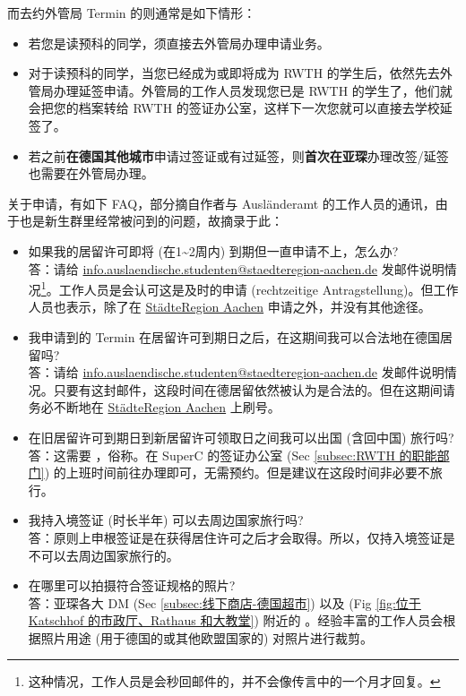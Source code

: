     而去约外管局 Termin 的则通常是如下情形：

    \begin{itemize}
      \item 若您是读预科的同学，须直接去外管局办理申请业务。
      \item 对于读预科的同学，当您已经成为或即将成为 RWTH 的学生后，依然先去外管局办理延签申请。外管局的工作人员发现您已是 RWTH 的学生了，他们就会把您的档案转给 RWTH 的签证办公室，这样下一次您就可以直接去学校延签了。
      \item 若之前\textbf{在德国其他城市}申请过签证或有过延签，则\textbf{首次在亚琛}办理改签/延签也需要在外管局办理。
    \end{itemize}

    关于申请，有如下 FAQ，部分摘自作者与 Ausländeramt 的工作人员的通讯，由于也是新生群里经常被问到的问题，故摘录于此：

    \begin{itemize}
      \item 如果我的居留许可即将 (在1\textasciitilde2周内) 到期但一直申请不上，怎么办?\\
      答：请给 \href{mailto:info.auslaendische.studenten@staedteregion-aachen.de}{info.auslaendische.studenten@staedteregion-aachen.de} 发邮件说明情况\footnote{这种情况，工作人员是会秒回邮件的，并不会像传言中的一个月才回复。}。工作人员是会认可这是及时的申请 (rechtzeitige Antragstellung)。但工作人员也表示，除了在 \href{https://termine.staedteregion-aachen.de/auslaenderamt/}{StädteRegion Aachen} 申请之外，并没有其他途径。
      \item 我申请到的 Termin 在居留许可到期日之后，在这期间我可以合法地在德国居留吗?\\
      答：请给 \href{mailto:info.auslaendische.studenten@staedteregion-aachen.de}{info.auslaendische.studenten@staedteregion-aachen.de} 发邮件说明情况。只要有这封邮件，这段时间在德居留依然被认为是合法的。但在这期间请务必不断地在 \href{https://termine.staedteregion-aachen.de/auslaenderamt/}{StädteRegion Aachen} 上刷号。
      \item 在旧居留许可到期日到新居留许可领取日之间我可以出国 (含回中国) 旅行吗?\\
      答：这需要 ，俗称。在 SuperC 的签证办公室 (Sec \ref{subsec:RWTH 的职能部门}) 的上班时间前往办理即可，无需预约。但是建议在这段时间非必要不旅行。
      \item 我持入境签证 (时长半年) 可以去周边国家旅行吗?\\
      答：原则上申根签证是在获得居住许可之后才会取得。所以，仅持入境签证是不可以去周边国家旅行的。
      \item 在哪里可以拍摄符合签证规格的照片?\\
      答：亚琛各大 DM (Sec \ref{subsec:线下商店-德国超市}) 以及 (Fig \ref{fig:位于 Katschhof 的市政厅、Rathaus 和大教堂}) 附近的 。经验丰富的工作人员会根据照片用途 (用于德国的或其他欧盟国家的) 对照片进行裁剪。
    \end{itemize}

